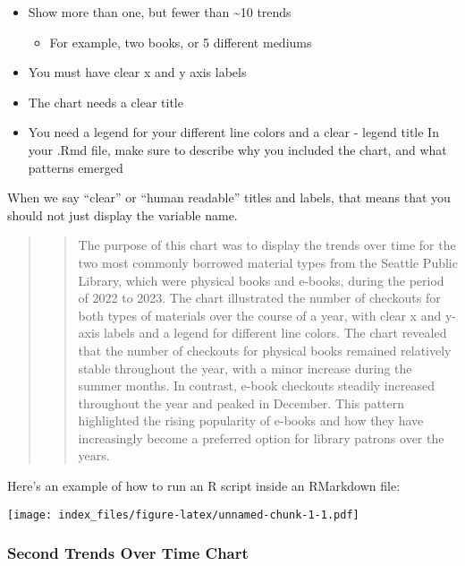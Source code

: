 \documentclass[
]{article}
\providecommand{\tightlist}{%
  \setlength{\itemsep}{0pt}\setlength{\parskip}{0pt}}
\begin{document}
\begin{itemize}
\item
  Show more than one, but fewer than \textasciitilde10 trends

  \begin{itemize}
  \tightlist
  \item
    For example, two books, or 5 different mediums
  \end{itemize}
\item
  You must have clear x and y axis labels
\item
  The chart needs a clear title~
\item
  You need a legend for your different line colors and a clear - legend
  title In your .Rmd file, make sure to describe why you included the
  chart, and what patterns emerged
\end{itemize}

When we say ``clear'' or ``human readable'' titles and labels, that
means that you should not just display the variable name.

\begin{quote}
\begin{quote}
The purpose of this chart was to display the trends over time for the
two most commonly borrowed material types from the Seattle Public
Library, which were physical books and e-books, during the period of
2022 to 2023. The chart illustrated the number of checkouts for both
types of materials over the course of a year, with clear x and y-axis
labels and a legend for different line colors. The chart revealed that
the number of checkouts for physical books remained relatively stable
throughout the year, with a minor increase during the summer months. In
contrast, e-book checkouts steadily increased throughout the year and
peaked in December. This pattern highlighted the rising popularity of
e-books and how they have increasingly become a preferred option for
library patrons over the years.
\end{quote}
\end{quote}

Here's an example of how to run an R script inside an RMarkdown file:

\texttt{[image: index\_files/figure-latex/unnamed-chunk-1-1.pdf]}

\hypertarget{second-trends-over-time-chart}{%
\subsubsection{Second Trends Over Time
Chart}\label{second-trends-over-time-chart}}
\end{document}
